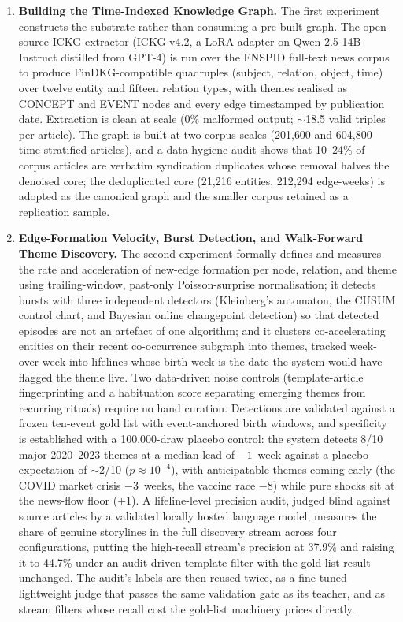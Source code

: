 \documentclass[a4paper,12pt]{report}
\begin{document}
\begin{enumerate}
\item \textbf{Building the Time-Indexed Knowledge Graph.} The first experiment
constructs the substrate rather than consuming a pre-built graph. The
open-source ICKG extractor (ICKG-v4.2, a LoRA adapter on Qwen-2.5-14B-Instruct
distilled from GPT-4) is run over the FNSPID full-text news corpus to produce
FinDKG-compatible quadruples (subject, relation, object, time) over twelve entity
and fifteen relation types, with themes realised as CONCEPT and EVENT nodes and
every edge timestamped by publication date. Extraction is clean at scale
(0\% malformed output; $\sim$18.5 valid triples per article). The graph
is built at two corpus
scales (201{,}600 and 604{,}800 time-stratified articles), and a data-hygiene
audit shows that 10--24\% of corpus articles are verbatim syndication
duplicates whose removal halves the denoised core; the deduplicated core
(21{,}216 entities, 212{,}294 edge-weeks) is adopted as the canonical
graph and the smaller corpus retained as a replication
sample.

\item \textbf{Edge-Formation Velocity, Burst Detection, and Walk-Forward Theme
Discovery.} The second experiment formally defines and
measures the rate and acceleration of new-edge formation per node, relation, and
theme using trailing-window, past-only Poisson-surprise normalisation; it
detects bursts with three independent detectors (Kleinberg's automaton, the
CUSUM control chart, and Bayesian online changepoint detection) so that
detected episodes are not an artefact of one algorithm; and it clusters co-accelerating entities on their recent
co-occurrence subgraph into themes, tracked week-over-week into lifelines whose
birth week is the date the system would have flagged the theme live. Two
data-driven noise controls (template-article fingerprinting and a habituation
score separating emerging themes from recurring rituals) require no hand
curation. Detections are validated against a frozen ten-event gold list with
event-anchored birth windows, and specificity is established with a
100{,}000-draw placebo control: the system detects 8/10 major 2020--2023
themes at a median lead of $-1$~week against a placebo expectation of
$\sim$2/10 ($p \approx 10^{-4}$), with anticipatable themes coming early
(the COVID market crisis $-3$~weeks, the vaccine race $-8$) while pure
shocks sit at the news-flow floor ($+1$). A lifeline-level precision audit, judged
blind against source articles by a validated locally hosted language model,
measures the share of genuine storylines in the full discovery stream across
four configurations, putting the high-recall stream's precision at
37.9\% and raising it to 44.7\% under an audit-driven template filter
with the gold-list result unchanged. The
audit's labels are then reused twice, as a fine-tuned lightweight judge
that passes the same validation gate as its teacher, and as stream
filters whose recall cost the gold-list machinery prices directly.


\end{enumerate}
\end{document}
